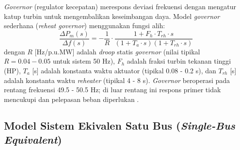 \textit{Governor} (regulator kecepatan) merespons deviasi frekuensi dengan mengatur katup turbin untuk mengembalikan keseimbangan daya. Model \textit{governor} sederhana (\textit{reheat governor}) menggunakan fungsi alih:
\begin{equation}
    \frac{\Delta P_{m}(s)}{\Delta f(s)} = -\frac{1}{R} \cdot \frac{1+F_{h}\cdot T_{rh}\cdot s}{(1+T_{a}\cdot s)(1+T_{rh}\cdot s)}
\end{equation}
dengan $R$ [Hz/p.u.MW] adalah \textit{droop} statis \textit{governor} (nilai tipikal $R=0.04 - 0.05$ untuk sistem 50 Hz), $F_{h}$ adalah fraksi turbin tekanan tinggi (HP), $T_{a}$ [s] adalah konstanta waktu aktuator (tipikal 0.08 - 0.2 s), dan $T_{rh}$ [s] adalah konstanta waktu \textit{reheater} (tipikal 4 - 8 s). \textit{Governor} beroperasi pada rentang frekuensi 49.5 - 50.5 Hz; di luar rentang ini respons primer tidak mencukupi dan pelepasan beban diperlukan \cite{Kundur1994}.

\subsection{Model Sistem Ekivalen Satu Bus (\textit{Single-Bus Equivalent})}
\label{subsec:Model_Sistem_Ekivalen}

